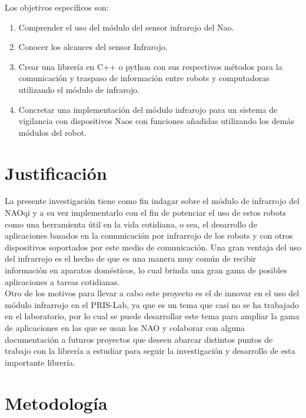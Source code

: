 \documentclass[letterpaper]{article}
\begin{document}
Los objetivos específicos son:\\

\begin{enumerate}

\item Comprender el uso del módulo del sensor infrarojo del Nao.
\item Conocer los alcances del sensor Infrarojo.
\item Crear una librería en C++ o python con sus respectivos métodos para la comunicación y traspaso de información entre robots y computadoras utilizando el módulo de infrarojo.
\item Concretar una implementación del módulo infrarojo para un sistema de vigilancia con dispositivos Naos con funciones añadidas utilizando los demás módulos del robot.

\end{enumerate}

\section{Justificación}

La presente investigación tiene como fin indagar sobre el módulo de infrarrojo del NAOqi y a su vez implementarlo con el fin de potenciar el uso de estos robots como una herramienta útil en la vida cotidiana, o sea, el desarrollo de aplicaciones basados en la comunicación por infrarrojo de los robots y con otros dispositivos soportados por este medio de comunicación. Una gran ventaja del uso del infrarrojo es el hecho de que es una manera muy común de recibir información en aparatos domésticos, lo cual brinda una gran gama de posibles aplicaciones a tareas cotidianas. 
\\ Otro de los motivos para llevar a cabo este proyecto es el de innovar en el uso del módulo infrarrojo en el PRIS-Lab, ya que es un tema que casi no se ha trabajado en el laboratorio, por lo cual se puede desarrollar este tema para ampliar la gama de aplicaciones en las que se usan los NAO y colaborar con alguna documentación a futuros proyectos que deseen abarcar distintos puntos de trabajo con la librería a estudiar para seguir la investigación y desarrollo de esta importante librería.  

\section{Metodología}
\end{document}
